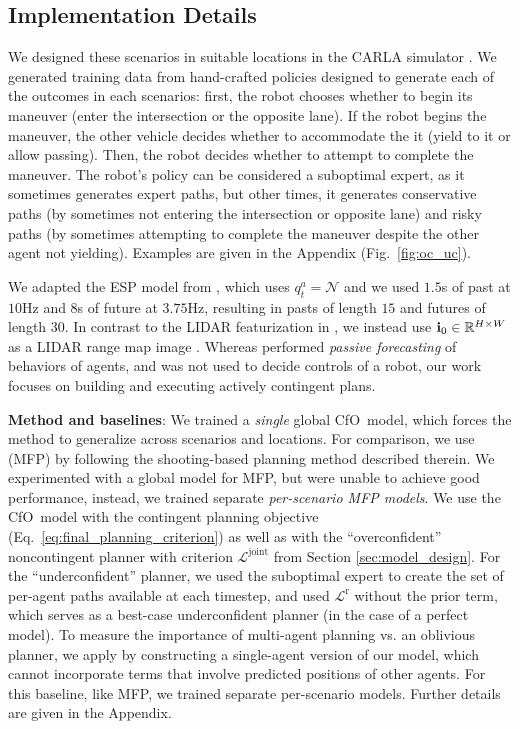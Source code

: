 \documentclass[conference]{IEEEtran}
\newcommand{\ours}[0]{{CfO}}
\begin{document}
\subsection{Implementation Details}\label{sec:impl}
\vspace{-.25em}
We designed these scenarios in suitable locations in the CARLA simulator \citep{dosovitskiy_carla_2017}.
We generated training data from hand-crafted policies designed to generate each of the outcomes in each scenarios:
first, the robot chooses whether to begin its maneuver (enter the intersection or the opposite lane).
If the robot begins the maneuver, the other vehicle decides whether to accommodate the it (yield to it or allow passing). Then, the robot decides whether to attempt to complete the maneuver. The robot's policy can be considered a suboptimal expert, as it sometimes generates expert paths, but other times, it generates conservative paths (by sometimes not entering the intersection or opposite lane) and risky paths (by sometimes attempting to complete the maneuver despite the other agent not yielding). Examples are given in the Appendix (Fig.~\ref{fig:oc_uc}).

We adapted the ESP model from \citep{rhinehart2019precog}, which uses $q_t^a=\mathcal N$ and we used $1.5$s of past at $10$Hz and $8$s of future at $3.75$Hz, resulting in pasts of length $15$ and futures of length $30$. In contrast to the LIDAR featurization in \citep{rhinehart2019precog}, we instead use $\mathbf{i}_0\in\mathbb{R}^{H\times W}$ as a LIDAR range map image \cite{caccia2018deep}. Whereas \citep{rhinehart2019precog} performed \emph{passive forecasting} of behaviors of agents, and was not used to decide controls of a robot, our work focuses on building and executing actively contingent plans.

\noindent\textbf{Method and baselines}: We trained a \emph{single} global \ours~model, which forces the method to generalize across scenarios and locations. For comparison, we use \cite{tang2019mfp} (MFP) by following the shooting-based planning method described therein. We experimented with a global model for MFP, but were unable to achieve good performance, instead, we trained separate \emph{per-scenario MFP models}. We use the \ours~model with the contingent planning objective (Eq.~\ref{eq:final_planning_criterion}) as well as with the ``overconfident'' noncontingent planner with criterion $\mathcal{L}^\textrm{joint}$ from Section \ref{sec:model_design}. For the ``underconfident'' planner, we used the suboptimal expert to create the set of per-agent paths available at each timestep, and used $\mathcal{L}^\textrm{r}$ without the prior term, which serves as a best-case underconfident planner (in the case of a perfect model). To measure the importance of multi-agent planning vs. an oblivious planner, we apply \citep{rhinehart2020deep} by constructing a single-agent version of our model, which cannot incorporate terms that involve predicted positions of other agents. For this baseline, like MFP, we trained separate per-scenario models. Further details are given in the Appendix.
\end{document}
